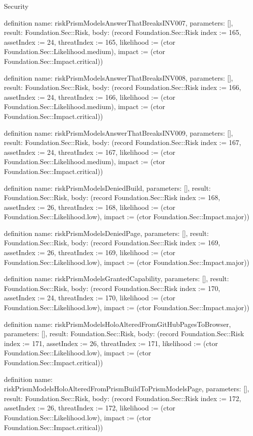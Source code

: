 \begin{lexlean}{Security}
\begin{semanticmodule}
definition{
  name: riskPrismModelsAnswerThatBreaksINV007,
  parameters: [],
  result: Foundation.Sec::Risk,
  body: (record Foundation.Sec::Risk {index := 165, assetIndex := 24, threatIndex := 165, likelihood := (ctor Foundation.Sec::Likelihood.medium), impact := (ctor Foundation.Sec::Impact.critical)})
}

definition{
  name: riskPrismModelsAnswerThatBreaksINV008,
  parameters: [],
  result: Foundation.Sec::Risk,
  body: (record Foundation.Sec::Risk {index := 166, assetIndex := 24, threatIndex := 166, likelihood := (ctor Foundation.Sec::Likelihood.medium), impact := (ctor Foundation.Sec::Impact.critical)})
}

definition{
  name: riskPrismModelsAnswerThatBreaksINV009,
  parameters: [],
  result: Foundation.Sec::Risk,
  body: (record Foundation.Sec::Risk {index := 167, assetIndex := 24, threatIndex := 167, likelihood := (ctor Foundation.Sec::Likelihood.medium), impact := (ctor Foundation.Sec::Impact.critical)})
}

definition{
  name: riskPrismModelsDeniedBuild,
  parameters: [],
  result: Foundation.Sec::Risk,
  body: (record Foundation.Sec::Risk {index := 168, assetIndex := 26, threatIndex := 168, likelihood := (ctor Foundation.Sec::Likelihood.low), impact := (ctor Foundation.Sec::Impact.major)})
}

definition{
  name: riskPrismModelsDeniedPage,
  parameters: [],
  result: Foundation.Sec::Risk,
  body: (record Foundation.Sec::Risk {index := 169, assetIndex := 26, threatIndex := 169, likelihood := (ctor Foundation.Sec::Likelihood.low), impact := (ctor Foundation.Sec::Impact.major)})
}

definition{
  name: riskPrismModelsGrantedCapability,
  parameters: [],
  result: Foundation.Sec::Risk,
  body: (record Foundation.Sec::Risk {index := 170, assetIndex := 24, threatIndex := 170, likelihood := (ctor Foundation.Sec::Likelihood.low), impact := (ctor Foundation.Sec::Impact.major)})
}

definition{
  name: riskPrismModelsHoloAlteredFromGitHubPagesToBrowser,
  parameters: [],
  result: Foundation.Sec::Risk,
  body: (record Foundation.Sec::Risk {index := 171, assetIndex := 26, threatIndex := 171, likelihood := (ctor Foundation.Sec::Likelihood.low), impact := (ctor Foundation.Sec::Impact.critical)})
}

definition{
  name: riskPrismModelsHoloAlteredFromPrismBuildToPrismModelsPage,
  parameters: [],
  result: Foundation.Sec::Risk,
  body: (record Foundation.Sec::Risk {index := 172, assetIndex := 26, threatIndex := 172, likelihood := (ctor Foundation.Sec::Likelihood.low), impact := (ctor Foundation.Sec::Impact.critical)})
}


\end{semanticmodule}
\end{lexlean}
